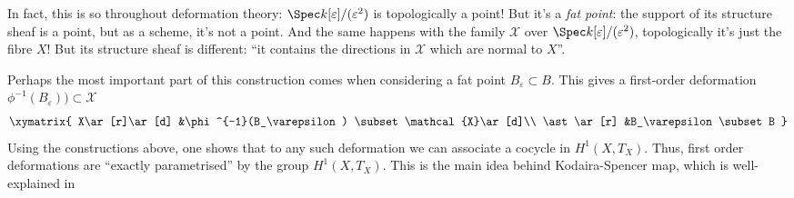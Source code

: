 \documentclass{book}
\begin{document}
In fact, this is so throughout deformation
theory:
$\Spec k[\varepsilon]/(\varepsilon^2)$ is
topologically a point!
But it's a {\it fat point}: the support of
its
structure sheaf is a point, but as a scheme,
it's not a point.
And the same happens with the family
$\mathcal{X}$ over
$\Spec k[\varepsilon]/(\varepsilon^2)$,
topologically it's just the fibre $X$!
But its structure sheaf is different:
``it contains the directions in $\mathcal{X}$
which
are normal to $X$''.

\medskip\noindent
Perhaps the most important part of this
construction
comes when considering a fat point
$B_\varepsilon \subset B$.
This gives a first-order deformation
$\phi^{-1}(B_\varepsilon)) \subset
\mathcal{X}$
$$
\xymatrix{
X\ar[r]\ar[d]
&\phi^{-1}(B_\varepsilon) \subset
\mathcal{X}\ar[d]\\
\ast\ar[r]
&B_\varepsilon \subset B
}
$$
Using the constructions above, one shows that
to any such deformation we can associate a
cocycle
in $H^1(X,T_X)$.
Thus, first order deformations are ``exactly
parametrised''
by the group $H^1(X,T_X)$.
This is the main idea behind Kodaira-Spencer
map,
which is well-explained in
\end{document}
